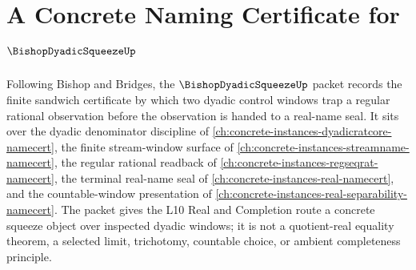 \chapter{A Concrete Naming Certificate for $\BishopDyadicSqueezeUp$}
\label{ch:concrete-instances-bishop-dyadic-squeeze-namecert}

Following Bishop and Bridges, the $\BishopDyadicSqueezeUp$ packet records the finite sandwich certificate by which two dyadic control windows trap a regular rational observation before the observation is handed to a real-name seal. It sits over the dyadic denominator discipline of \autoref{ch:concrete-instances-dyadicratcore-namecert}, the finite stream-window surface of \autoref{ch:concrete-instances-streamname-namecert}, the regular rational readback of \autoref{ch:concrete-instances-regseqrat-namecert}, the terminal real-name seal of \autoref{ch:concrete-instances-real-namecert}, and the countable-window presentation of \autoref{ch:concrete-instances-real-separability-namecert}. The packet gives the L10 Real and Completion route a concrete squeeze object over inspected dyadic windows; it is not a quotient-real equality theorem, a selected limit, trichotomy, countable choice, or ambient completeness principle.

